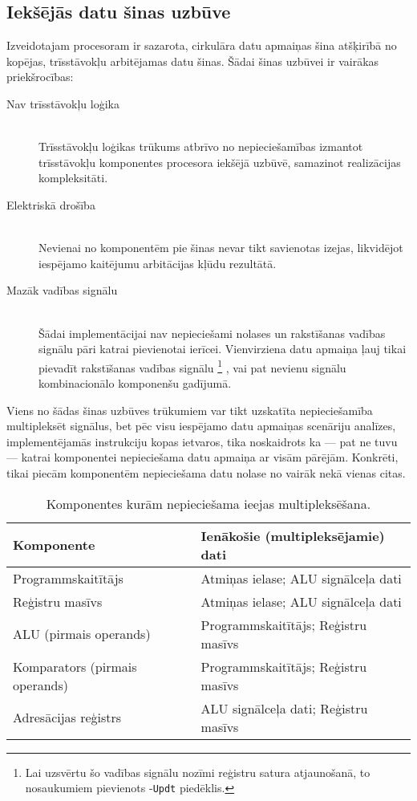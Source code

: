 \subsection{Iekšējās datu šinas uzbūve} \label{sec:databus}
Izveidotajam procesoram ir sazarota, cirkulāra datu apmaiņas šina atšķirībā no kopējas,
trīsstāvokļu arbitējamas datu šinas. Šādai šinas uzbūvei ir vairākas
priekšrocības:
\begin{description}
	\item[Nav trīsstāvokļu loģika] \hfill \\
		Trīsstāvokļu loģikas trūkums atbrīvo no nepieciešamības izmantot
		trīsstāvokļu komponentes procesora iekšējā uzbūvē,
		samazinot realizācijas kompleksitāti.
	\item[Elektriskā drošība] \hfill \\ %
		Nevienai no komponentēm pie šinas nevar tikt savienotas izejas,
		likvidējot iespējamo kaitējumu arbitācijas kļūdu rezultātā.
	\item[Mazāk vadības signālu] \hfill \\
		Šādai implementācijai nav nepieciešami nolases un rakstīšanas
		vadības signālu pāri katrai pievienotai ierīcei. Vienvirziena datu
		apmaiņa ļauj tikai pievadīt rakstīšanas vadības signālu%
		\footnote{Lai uzsvērtu šo vadības signālu nozīmi reģistru satura
			atjaunošanā, to nosaukumiem pievienots -\texttt{Updt} piedēklis.}%
		, vai pat nevienu signālu kombinacionālo komponenšu gadījumā.
\end{description}

Viens no šādas šinas uzbūves trūkumiem var tikt uzskatīta nepieciešamība
multipleksēt signālus, bet pēc visu iespējamo datu apmaiņas scenāriju analīzes,
implementējamās instrukciju kopas ietvaros, tika noskaidrots ka --- 
pat ne tuvu --- katrai komponentei nepieciešama datu apmaiņa ar visām pārējām.
Konkrēti, tikai piecām komponentēm nepieciešama datu nolase no vairāk
nekā vienas citas.

\begin{table}[hb]
	\centering
	\caption{Komponentes kurām nepieciešama ieejas multipleksēšana.}
	\label{tbl:muxes}
	\begin{tabular}{ll}
		\toprule
		Komponente & Ienākošie (multipleksējamie) dati\\ 
		\midrule
		Programmskaitītājs & Atmiņas ielase; ALU signālceļa dati\\
		Reģistru masīvs & Atmiņas ielase; ALU signālceļa dati\\
		ALU (pirmais operands) & Programmskaitītājs; Reģistru masīvs\\
		Komparators (pirmais operands) & Programmskaitītājs; Reģistru masīvs\\
		Adresācijas reģistrs & ALU signālceļa dati; Reģistru masīvs\\
		\bottomrule
	\end{tabular}
\end{table}


